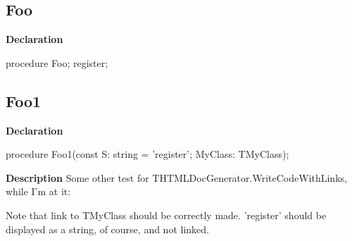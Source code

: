 \documentclass{report}
\newif\ifpdf
\begin{document}
\subsection*{Foo}
\fi
\label{ok_directive_as_identifier-Foo}
\begin{list}{}{
\setlength{\itemindent}{0cm}
\setlength{\listparindent}{0cm}
\setlength{\leftmargin}{\evensidemargin}
\addtolength{\leftmargin}{\tmplength}
\settowidth{\labelsep}{X}
\addtolength{\leftmargin}{\labelsep}
\setlength{\labelwidth}{\tmplength}
}
\item[\textbf{Declaration}\hfill]
\ifpdf
\begin{flushleft}
\fi
\begin{ttfamily}
procedure Foo; register;\end{ttfamily}

\ifpdf
\end{flushleft}
\fi

\end{list}
\ifpdf
\subsection*{\large{\textbf{Foo1}}\normalsize\hspace{1ex}\hrulefill}
\else
\subsection*{Foo1}
\fi
\label{ok_directive_as_identifier-Foo1}
\begin{list}{}{
\setlength{\itemindent}{0cm}
\setlength{\listparindent}{0cm}
\setlength{\leftmargin}{\evensidemargin}
\addtolength{\leftmargin}{\tmplength}
\settowidth{\labelsep}{X}
\addtolength{\leftmargin}{\labelsep}
\setlength{\labelwidth}{\tmplength}
}
\item[\textbf{Declaration}\hfill]
\ifpdf
\begin{flushleft}
\fi
\begin{ttfamily}
procedure Foo1(const S: string = 'register'; MyClass: TMyClass);\end{ttfamily}

\ifpdf
\end{flushleft}
\fi

\par
\item[\textbf{Description}]
Some other test for THTMLDocGenerator.WriteCodeWithLinks, while I'm at it:

Note that link to TMyClass should be correctly made. 'register' should be displayed as a string, of course, and not linked.

\end{list}
\ifpdf
\end{document}
